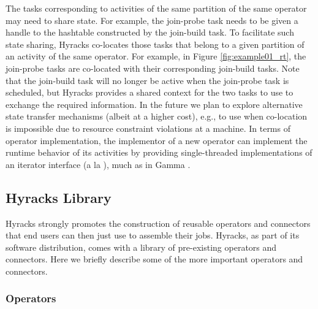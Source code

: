 \begin{enumerate}
The tasks corresponding to activities of the same partition of the same operator may need to share state.
For example, the join-probe task needs to be given a handle to the hashtable constructed by the join-build task.
To facilitate such state sharing, Hyracks co-locates those tasks that belong to a given partition of an activity of the same operator.
For example, in Figure \ref{fig:example01_rt}, the join-probe tasks are co-located with their corresponding join-build tasks.
Note that the join-build task will no longer be active when the join-probe task is scheduled, but Hyracks provides a shared context
for the two tasks to use to exchange the required information.
In the future we plan to explore alternative state transfer mechanisms (albeit at a higher cost),
e.g., to use when co-location is impossible due to resource constraint violations at a machine.
In terms of operator implementation, the implementor of a new operator can implement the runtime behavior
of its activities by providing single-threaded implementations of an iterator interface (a la \cite{GraefeQP}),
much as in Gamma \cite{GammaTKDE}.

\subsection{Hyracks Library}

Hyracks strongly promotes the construction of reusable operators and connectors that end users can then just use to assemble their jobs.
Hyracks, as part of its software distribution, comes with a library of pre-existing operators and connectors.
Here we briefly describe some of the more important operators and connectors.

\subsubsection{Operators}


\end{enumerate}
